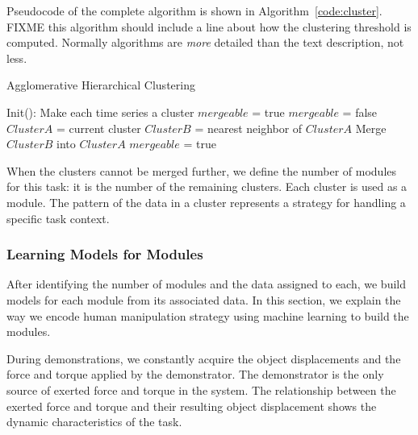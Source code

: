 Pseudocode of the complete algorithm is shown in
Algorithm~\ref{code:cluster}.  FIXME this algorithm should include a
line about how the clustering
threshold is computed.  Normally algorithms are {\em more} detailed
than the text description, not less. %

\begin{algorithm}
  \caption{Agglomerative Hierarchical Clustering}
  \begin{algorithmic}[1]
    \State Init(): Make each time series a cluster\;
    \State $mergeable$ = true\;
      \State $mergeable$ = false\;
        \State $ClusterA$ = current cluster\;
        \State $ClusterB$ = nearest neighbor of $ClusterA$\;
            \State Merge $ClusterB$ into $ClusterA$\;
            \State $mergeable$ = true\;
        \EndIf
      \EndFor
    \EndWhile
    \EndFunction
  \end{algorithmic}
  \label{code:cluster}
\end{algorithm}



When the clusters cannot be merged further, we define the number of
modules for this task: it is the number of the remaining
clusters. Each cluster is used as a module. The pattern of the data in
a cluster represents a strategy for handling a specific task context.

\subsubsection{Learning Models for Modules}
\label{sec:model}
After identifying the number of modules and the data assigned to each,
we build models for each module from its associated data. In this
section, we explain the way we encode human manipulation strategy
using machine learning to build the modules.

During demonstrations, we constantly acquire the object displacements
and the force and torque applied by the demonstrator. The demonstrator
is the only source of exerted force and torque in the system. The
relationship between the exerted force and torque and their resulting
object displacement shows the dynamic characteristics of the task.

